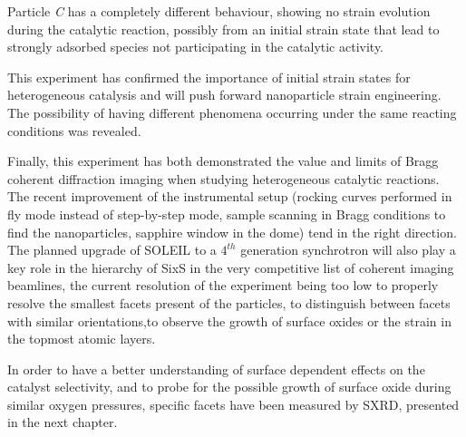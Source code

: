 Particle \textit{C} has a completely different behaviour, showing no strain evolution during the catalytic reaction, possibly from an initial strain state that lead to strongly adsorbed species not participating in the catalytic activity.

This experiment has confirmed the importance of initial strain states for heterogeneous catalysis and will push forward nanoparticle strain engineering.
The possibility of having different phenomena occurring under the same reacting conditions was revealed.

Finally, this experiment has both demonstrated the value and limits of Bragg coherent diffraction imaging when studying heterogeneous catalytic reactions.
The recent improvement of the instrumental setup (rocking curves performed in fly mode instead of step-by-step mode, sample scanning in Bragg conditions to find the nanoparticles, sapphire window in the dome) tend in the right direction.
The planned upgrade of SOLEIL to a $4^{th}$ generation synchrotron will also play a key role in the hierarchy of SixS in the very competitive list of coherent imaging beamlines, the current resolution of the experiment being too low to properly resolve the smallest facets present of the particles, to distinguish between facets with similar orientations,to observe the growth of surface oxides or the strain in the topmost atomic layers.

In order to have a better understanding of surface dependent effects on the catalyst selectivity, and to probe for the possible growth of surface oxide during similar oxygen pressures, specific facets have been measured by SXRD, presented in the next chapter.